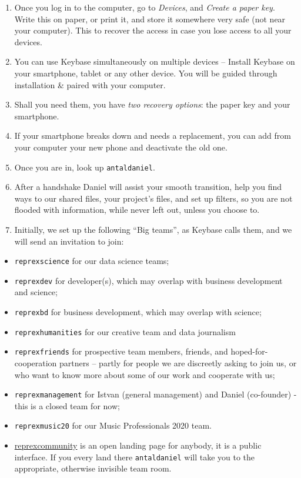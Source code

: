 \documentclass[
  fontsize=13pt,
  english,
  a4paper,
  openany, a4paper, oneside]{book}
\providecommand{\tightlist}{%
  \setlength{\itemsep}{0pt}\setlength{\parskip}{0pt}}
\begin{document}
\begin{enumerate}
\def\labelenumi{\arabic{enumi}.}
\setcounter{enumi}{1}
\item
  Once you log in to the computer, go to \emph{Devices}, and \emph{Create a paper key}. Write this on paper, or print it, and store it somewhere very safe (not near your computer). This to recover the access in case you lose access to all your devices.
\item
  You can use Keybase simultaneously on multiple devices -- Install Keybase on your smartphone, tablet or any other device. You will be guided through installation \& paired with your computer.
\item
  Shall you need them, you have \emph{two recovery options}: the paper key and your smartphone.
\item
  If your smartphone breaks down and needs a replacement, you can add from your computer your new phone and deactivate the old one.
\item
  Once you are in, look up \texttt{antaldaniel}.
\item
  After a handshake Daniel will assist your smooth transition, help you find ways to our shared files, your project's files, and set up filters, so you are not flooded with information, while never left out, unless you choose to.
\item
  Initially, we set up the following ``Big teams'', as Keybase calls them, and we will send an invitation to join:
\end{enumerate}

\begin{itemize}
\tightlist
\item
  \texttt{reprexscience} for our data science teams;
\item
  \texttt{reprexdev} for developer(s), which may overlap with business development and science;
\item
  \texttt{reprexbd} for business development, which may overlap with science;
\item
  \texttt{reprexhumanities} for our creative team and data journalism
\item
  \texttt{reprexfriends} for prospective team members, friends, and hoped-for-cooperation partners -- partly for people we are discreetly asking to join us, or who want to know more about some of our work and cooperate with us;
\item
  \texttt{reprexmanagement} for Istvan (general management) and Daniel (co-founder) - this is a closed team for now;
\item
  \texttt{reprexmusic20} for our Music Professionals 2020 team.
\item
  \href{https://keybase.io/team/reprexcommunity}{reprexcommunity} is an open landing page for anybody, it is a public interface. If you every land there \texttt{antaldaniel} will take you to the appropriate, otherwise invisible team room.
\end{itemize}
\end{document}
